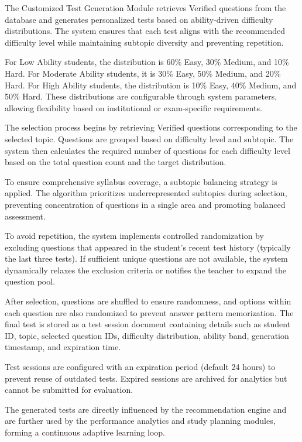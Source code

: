\begin{sloppypar}
The Customized Test Generation Module retrieves Verified questions from the database and generates personalized tests based on ability-driven difficulty distributions. The system ensures that each test aligns with the recommended difficulty level while maintaining subtopic diversity and preventing repetition.

For Low Ability students, the distribution is 60\% Easy, 30\% Medium, and 10\% Hard. For Moderate Ability students, it is 30\% Easy, 50\% Medium, and 20\% Hard. For High Ability students, the distribution is 10\% Easy, 40\% Medium, and 50\% Hard. These distributions are configurable through system parameters, allowing flexibility based on institutional or exam-specific requirements.

The selection process begins by retrieving Verified questions corresponding to the selected topic. Questions are grouped based on difficulty level and subtopic. The system then calculates the required number of questions for each difficulty level based on the total question count and the target distribution.

To ensure comprehensive syllabus coverage, a subtopic balancing strategy is applied. The algorithm prioritizes underrepresented subtopics during selection, preventing concentration of questions in a single area and promoting balanced assessment.

To avoid repetition, the system implements controlled randomization by excluding questions that appeared in the student's recent test history (typically the last three tests). If sufficient unique questions are not available, the system dynamically relaxes the exclusion criteria or notifies the teacher to expand the question pool.

After selection, questions are shuffled to ensure randomness, and options within each question are also randomized to prevent answer pattern memorization. The final test is stored as a test session document containing details such as student ID, topic, selected question IDs, difficulty distribution, ability band, generation timestamp, and expiration time.

Test sessions are configured with an expiration period (default 24 hours) to prevent reuse of outdated tests. Expired sessions are archived for analytics but cannot be submitted for evaluation.

The generated tests are directly influenced by the recommendation engine and are further used by the performance analytics and study planning modules, forming a continuous adaptive learning loop.


\end{sloppypar}
